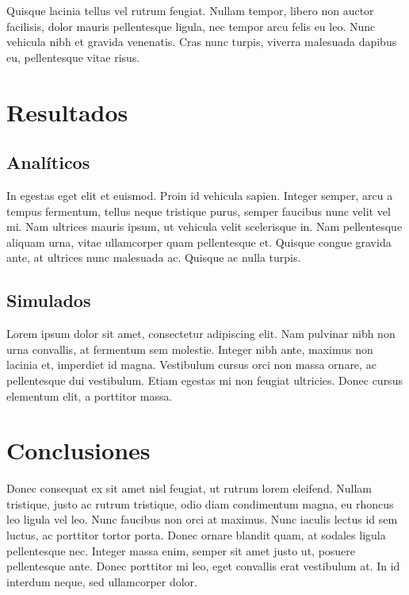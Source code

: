 \documentclass[11pt, twocolumn]{article}
\begin{document}
    Quisque lacinia tellus vel rutrum feugiat. Nullam tempor, libero non auctor facilisis, dolor mauris pellentesque ligula, nec tempor arcu felis eu leo. Nunc vehicula nibh et gravida venenatis. Cras nunc turpis, viverra malesuada dapibus eu, pellentesque vitae risus.

    \section{Resultados}
    
    \subsection{Analíticos}
    In egestas eget elit et euismod. Proin id vehicula sapien. Integer semper, arcu a tempus fermentum, tellus neque tristique purus, semper faucibus nunc velit vel mi. Nam ultrices mauris ipsum, ut vehicula velit scelerisque in. Nam pellentesque aliquam urna, vitae ullamcorper quam pellentesque et. Quisque congue gravida ante, at ultrices nunc malesuada ac. Quisque ac nulla turpis. 
    
    \subsection{Simulados}
    Lorem ipsum dolor sit amet, consectetur adipiscing elit. Nam pulvinar nibh non urna convallis, at fermentum sem molestie. Integer nibh ante, maximus non lacinia et, imperdiet id magna. Vestibulum cursus orci non massa ornare, ac pellentesque dui vestibulum. Etiam egestas mi non feugiat ultricies. Donec cursus elementum elit, a porttitor massa.

    \section{Conclusiones}
    Donec consequat ex sit amet nisl feugiat, ut rutrum lorem eleifend. Nullam tristique, justo ac rutrum tristique, odio diam condimentum magna, eu rhoncus leo ligula vel leo. Nunc faucibus non orci at maximus. Nunc iaculis lectus id sem luctus, ac porttitor tortor porta. Donec ornare blandit quam, at sodales ligula pellentesque nec. Integer massa enim, %
    semper sit amet justo ut, posuere pellentesque ante. Donec porttitor mi leo, eget convallis erat vestibulum at. In id interdum neque, sed ullamcorper dolor.
\end{document}
